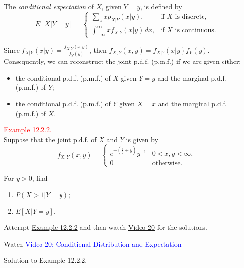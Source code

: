 \documentclass[
]{book}
\providecommand{\tightlist}{%
  \setlength{\itemsep}{0pt}\setlength{\parskip}{0pt}}
\begin{document}
The \emph{conditional expectation} of \(X\), given \(Y=y\), is defined by\\

\[E[X|Y=y] = \begin{cases} \sum\limits_x xp_{X|Y}(x|y), & \text{if $X$ is discrete,} \\
\int_{-\infty}^\infty xf_{X|Y}(x|y) \,dx, & \text{if $X$ is continuous.} \end{cases} \]

Since \(f_{X|Y}(x|y) = \frac{f_{X,Y}(x,y)}{f_Y(y)}\), then \(f_{X,Y}(x,y) = f_{X|Y}(x|y)f_Y(y)\). Consequently, we can reconstruct the joint p.d.f. (p.m.f.) if we are given either:

\begin{itemize}
\item
  the conditional p.d.f. (p.m.f.) of \(X\) given \(Y=y\) and the marginal p.d.f. (p.m.f.) of \(Y\);
\item
  the conditional p.d.f. (p.m.f.) of \(Y\) given \(X=x\) and the marginal p.d.f. (p.m.f.) of \(X\).
\end{itemize}

\hypertarget{CondDis:exer:cond_example}{}
\textcolor{red}{Example 12.2.2.}\\
Suppose that the joint p.d.f. of \(X\) and \(Y\) is given by\\

\[ f_{X,Y}(x,y)= \begin{cases} e^{-(\frac{x}{y}+y)}y^{-1} & 0<x,y<\infty, \\ 0 & \text{otherwise.}\end{cases} \]

For \(y>0\), find

\begin{enumerate}
\def\labelenumi{(\alph{enumi})}
\tightlist
\item
  \(P(X>1|Y=y)\);\\
\item
  \(E[X|Y=y]\).\\
\end{enumerate}

Attempt \protect\hyperlink{CondDis:exer:cond_example}{Example 12.2.2} and then watch \protect\hyperlink{video20}{Video 20} for the solutions.

Watch \href{https://mediaspace.nottingham.ac.uk/media/Conditional+Distribution+and+Expectation+FINAL+VERSION/1_aaq1gryx}{\textcolor{blue}{Video 20: Conditional Distribution and Expectation}}

Solution to Example 12.2.2.
\end{document}
